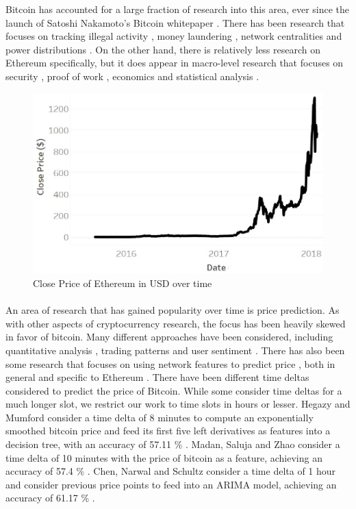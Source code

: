 \documentclass[12pt]{article}%
\begin{document}
Bitcoin has accounted for a large fraction of research into this area, ever since the launch of Satoshi Nakamoto’s Bitcoin whitepaper \cite{9}. There has been research that focuses on tracking illegal activity \cite{10}, money laundering \cite{11}, network centralities \cite{12} and power distributions \cite{13}. On the other hand, there is relatively less research on Ethereum specifically, but it does appear in macro-level research that focuses on security \cite{14}, proof of work \cite{15}, economics \cite{16} and statistical analysis \cite{17}.

\begin{figure}[h]
\centering
\includegraphics[width=0.8\columnwidth]{close_price}
\caption{Close Price of Ethereum in USD over time}
\end{figure}

\paragraph{}An area of research that has gained popularity over time is price prediction. As with other aspects of cryptocurrency research, the focus has been heavily skewed in favor of bitcoin. Many different approaches have been considered, including quantitative analysis \cite{18}, trading patterns \cite{19} and user sentiment \cite{20} \cite{21}. There has also been some research that focuses on using network features to predict price \cite{22} \cite{23}, both in general and specific to Ethereum \cite{24}. There have been different time deltas considered to predict the price of Bitcoin. While some consider time deltas for a much longer slot, we restrict our work to time slots in hours or lesser.  Hegazy and Mumford consider a time delta of 8 minutes to compute an exponentially smoothed bitcoin price and feed its first five left derivatives as features into a decision tree, with an accuracy of 57.11 \% \cite{24}. Madan, Saluja and Zhao consider a time delta of 10 minutes with the price of bitcoin as a feature, achieving an accuracy of 57.4 \% \cite{25}. Chen, Narwal and Schultz consider a time delta of 1 hour and consider previous price points to feed into an ARIMA model, achieving an accuracy of 61.17 \% \cite{26}.
\end{document}
